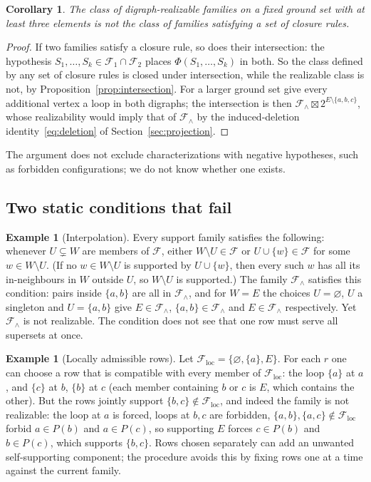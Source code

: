 \documentclass[11pt,a4paper]{article}
\theoremstyle{plain}
\newtheorem{corollary}[theorem]{Corollary}
\theoremstyle{definition}
\newtheorem{example}[theorem]{Example}
\theoremstyle{remark}
\newcommand{\cF}{\mathcal F}
\newcommand{\pw}[1]{2^{#1}}
\begin{document}
\begin{corollary}\label{cor:noclosure}
The class of digraph-realizable families on a fixed ground set with at least three elements is not the class of families satisfying a set of closure rules.
\end{corollary}

\begin{proof}
If two families satisfy a closure rule, so does their intersection: the hypothesis $S_1,\dots,S_k\in\cF_1\cap\cF_2$ places $\Phi(S_1,\dots,S_k)$ in both. So the class defined by any set of closure rules is closed under intersection, while the realizable class is not, by Proposition~\ref{prop:intersection}. For a larger ground set give every additional vertex a loop in both digraphs; the intersection is then $\cF_\wedge\boxtimes\pw{E\setminus\{a,b,c\}}$, whose realizability would imply that of $\cF_\wedge$ by the induced-deletion identity~\eqref{eq:deletion} of Section~\ref{sec:projection}.
\end{proof}

The argument does not exclude characterizations with negative hypotheses, such as forbidden configurations; we do not know whether one exists.

\subsection{Two static conditions that fail}

\begin{example}[Interpolation]\label{ex:interp}
Every support family satisfies the following: whenever $U\subsetneq W$ are members of $\cF$, either $W\setminus U\in\cF$ or $U\cup\{w\}\in\cF$ for some $w\in W\setminus U$. (If no $w\in W\setminus U$ is supported by $U\cup\{w\}$, then every such $w$ has all its in-neighbours in $W$ outside $U$, so $W\setminus U$ is supported.) The family $\cF_\wedge$ satisfies this condition: pairs inside $\{a,b\}$ are all in $\cF_\wedge$, and for $W=E$ the choices $U=\varnothing$, $U$ a singleton and $U=\{a,b\}$ give $E\in\cF_\wedge$, $\{a,b\}\in\cF_\wedge$ and $E\in\cF_\wedge$ respectively. Yet $\cF_\wedge$ is not realizable. The condition does not see that one row must serve all supersets at once.
\end{example}

\begin{example}[Locally admissible rows]\label{ex:local}
Let $\cF_{\mathrm{loc}}=\{\varnothing,\{a\},E\}$. For each $r$ one can choose a row that is compatible with every member of $\cF_{\mathrm{loc}}$: the loop $\{a\}$ at $a$, and $\{c\}$ at $b$, $\{b\}$ at $c$ (each member containing $b$ or $c$ is $E$, which contains the other). But the rows jointly support $\{b,c\}\notin\cF_{\mathrm{loc}}$, and indeed the family is not realizable: the loop at $a$ is forced, loops at $b,c$ are forbidden, $\{a,b\},\{a,c\}\notin\cF_{\mathrm{loc}}$ forbid $a\in P(b)$ and $a\in P(c)$, so supporting $E$ forces $c\in P(b)$ and $b\in P(c)$, which supports $\{b,c\}$. Rows chosen separately can add an unwanted self-supporting component; the procedure avoids this by fixing rows one at a time against the current family.
\end{example}
\end{document}
